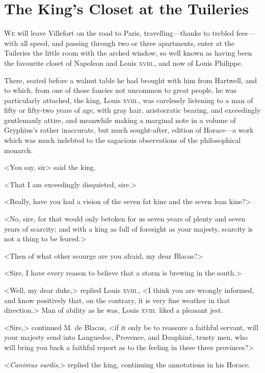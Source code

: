 \chapter{The King's Closet at the Tuileries} 

 \lettrine{W}{e} will leave Villefort on the road to Paris, travelling—thanks to trebled fees—with all speed, and passing through two or three apartments, enter at the Tuileries the little room with the arched window, so well known as having been the favourite closet of Napoleon and Louis \textsc{xviii.}, and now of Louis Philippe. 

 There, seated before a walnut table he had brought with him from Hartwell, and to which, from one of those fancies not uncommon to great people, he was particularly attached, the king, Louis \textsc{xviii.}, was carelessly listening to a man of fifty or fifty-two years of age, with gray hair, aristocratic bearing, and exceedingly gentlemanly attire, and meanwhile making a marginal note in a volume of Gryphius's rather inaccurate, but much sought-after, edition of Horace—a work which was much indebted to the sagacious observations of the philosophical monarch. 

 <You say, sir\longdash> said the king. 

 <That I am exceedingly disquieted, sire.> 

 <Really, have you had a vision of the seven fat kine and the seven lean kine?> 

 <No, sire, for that would only betoken for us seven years of plenty and seven years of scarcity; and with a king as full of foresight as your majesty, scarcity is not a thing to be feared.> 

 <Then of what other scourge are you afraid, my dear Blacas?> 

 <Sire, I have every reason to believe that a storm is brewing in the south.> 

 <Well, my dear duke,> replied Louis \textsc{xviii.}, <I think you are wrongly informed, and know positively that, on the contrary, it is very fine weather in that direction.> Man of ability as he was, Louis \textsc{xviii.} liked a pleasant jest. 

 <Sire,> continued M. de Blacas, <if it only be to reassure a faithful servant, will your majesty send into Languedoc, Provence, and Dauphiné, trusty men, who will bring you back a faithful report as to the feeling in these three provinces?> 

 <\textit{Canimus surdis},> replied the king, continuing the annotations in his Horace. 

